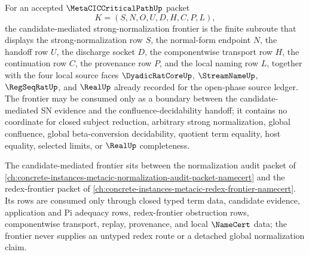 \begin{definition}
\label{def:metacic-critical-path-candidate-mediated-frontier}
For an accepted $\MetaCICCriticalPathUp$ packet
$$
K=(S,N,O,U,D,H,C,P,L),
$$
the candidate-mediated strong-normalization frontier is the finite subroute that displays the strong-normalization row $S$, the normal-form endpoint $N$, the handoff row $U$, the discharge socket $D$, the componentwise transport row $H$, the continuation row $C$, the provenance row $P$, and the local naming row $L$, together with the four local source faces $\DyadicRatCoreUp$, $\StreamNameUp$, $\RegSeqRatUp$, and $\RealUp$ already recorded for the open-phase source ledger. The frontier may be consumed only as a boundary between the candidate-mediated SN evidence and the confluence-decidability handoff; it contains no coordinate for closed subject reduction, arbitrary strong normalization, global confluence, global beta-conversion decidability, quotient term equality, host equality, selected limits, or $\RealUp$ completeness.
\end{definition}

The candidate-mediated frontier sits between the normalization audit packet of \autoref{ch:concrete-instances-metacic-normalization-audit-packet-namecert} and the redex-frontier packet of \autoref{ch:concrete-instances-metacic-redex-frontier-namecert}. Its rows are consumed only through closed typed term data, candidate evidence, application and Pi adequacy rows, redex-frontier obstruction rows, componentwise transport, replay, provenance, and local $\NameCert$ data; the frontier never supplies an untyped redex route or a detached global normalization claim.

